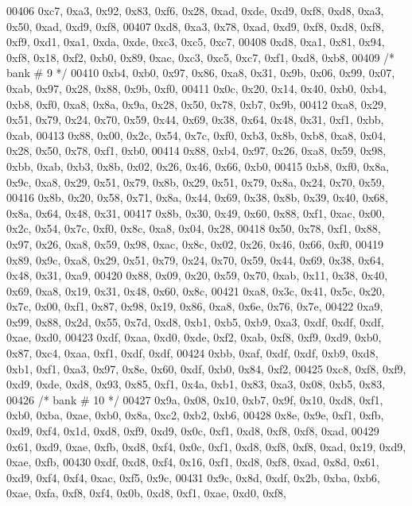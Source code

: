 \begin{DoxyCode}
00406     0xc7, 0xa3, 0x92, 0x83, 0xf6, 0x28, 0xad, 0xde, 0xd9, 0xf8, 0xd8, 0xa3, 0x50, 0xad, 0xd9, 0xf8,
00407     0xd8, 0xa3, 0x78, 0xad, 0xd9, 0xf8, 0xd8, 0xf8, 0xf9, 0xd1, 0xa1, 0xda, 0xde, 0xc3, 0xc5, 0xc7,
00408     0xd8, 0xa1, 0x81, 0x94, 0xf8, 0x18, 0xf2, 0xb0, 0x89, 0xac, 0xc3, 0xc5, 0xc7, 0xf1, 0xd8, 0xb8,
00409     \textcolor{comment}{/* bank # 9 */}
00410     0xb4, 0xb0, 0x97, 0x86, 0xa8, 0x31, 0x9b, 0x06, 0x99, 0x07, 0xab, 0x97, 0x28, 0x88, 0x9b, 0xf0,
00411     0x0c, 0x20, 0x14, 0x40, 0xb0, 0xb4, 0xb8, 0xf0, 0xa8, 0x8a, 0x9a, 0x28, 0x50, 0x78, 0xb7, 0x9b,
00412     0xa8, 0x29, 0x51, 0x79, 0x24, 0x70, 0x59, 0x44, 0x69, 0x38, 0x64, 0x48, 0x31, 0xf1, 0xbb, 0xab,
00413     0x88, 0x00, 0x2c, 0x54, 0x7c, 0xf0, 0xb3, 0x8b, 0xb8, 0xa8, 0x04, 0x28, 0x50, 0x78, 0xf1, 0xb0,
00414     0x88, 0xb4, 0x97, 0x26, 0xa8, 0x59, 0x98, 0xbb, 0xab, 0xb3, 0x8b, 0x02, 0x26, 0x46, 0x66, 0xb0,
00415     0xb8, 0xf0, 0x8a, 0x9c, 0xa8, 0x29, 0x51, 0x79, 0x8b, 0x29, 0x51, 0x79, 0x8a, 0x24, 0x70, 0x59,
00416     0x8b, 0x20, 0x58, 0x71, 0x8a, 0x44, 0x69, 0x38, 0x8b, 0x39, 0x40, 0x68, 0x8a, 0x64, 0x48, 0x31,
00417     0x8b, 0x30, 0x49, 0x60, 0x88, 0xf1, 0xac, 0x00, 0x2c, 0x54, 0x7c, 0xf0, 0x8c, 0xa8, 0x04, 0x28,
00418     0x50, 0x78, 0xf1, 0x88, 0x97, 0x26, 0xa8, 0x59, 0x98, 0xac, 0x8c, 0x02, 0x26, 0x46, 0x66, 0xf0,
00419     0x89, 0x9c, 0xa8, 0x29, 0x51, 0x79, 0x24, 0x70, 0x59, 0x44, 0x69, 0x38, 0x64, 0x48, 0x31, 0xa9,
00420     0x88, 0x09, 0x20, 0x59, 0x70, 0xab, 0x11, 0x38, 0x40, 0x69, 0xa8, 0x19, 0x31, 0x48, 0x60, 0x8c,
00421     0xa8, 0x3c, 0x41, 0x5c, 0x20, 0x7c, 0x00, 0xf1, 0x87, 0x98, 0x19, 0x86, 0xa8, 0x6e, 0x76, 0x7e,
00422     0xa9, 0x99, 0x88, 0x2d, 0x55, 0x7d, 0xd8, 0xb1, 0xb5, 0xb9, 0xa3, 0xdf, 0xdf, 0xdf, 0xae, 0xd0,
00423     0xdf, 0xaa, 0xd0, 0xde, 0xf2, 0xab, 0xf8, 0xf9, 0xd9, 0xb0, 0x87, 0xc4, 0xaa, 0xf1, 0xdf, 0xdf,
00424     0xbb, 0xaf, 0xdf, 0xdf, 0xb9, 0xd8, 0xb1, 0xf1, 0xa3, 0x97, 0x8e, 0x60, 0xdf, 0xb0, 0x84, 0xf2,
00425     0xc8, 0xf8, 0xf9, 0xd9, 0xde, 0xd8, 0x93, 0x85, 0xf1, 0x4a, 0xb1, 0x83, 0xa3, 0x08, 0xb5, 0x83,
00426     \textcolor{comment}{/* bank # 10 */}
00427     0x9a, 0x08, 0x10, 0xb7, 0x9f, 0x10, 0xd8, 0xf1, 0xb0, 0xba, 0xae, 0xb0, 0x8a, 0xc2, 0xb2, 0xb6,
00428     0x8e, 0x9e, 0xf1, 0xfb, 0xd9, 0xf4, 0x1d, 0xd8, 0xf9, 0xd9, 0x0c, 0xf1, 0xd8, 0xf8, 0xf8, 0xad,
00429     0x61, 0xd9, 0xae, 0xfb, 0xd8, 0xf4, 0x0c, 0xf1, 0xd8, 0xf8, 0xf8, 0xad, 0x19, 0xd9, 0xae, 0xfb,
00430     0xdf, 0xd8, 0xf4, 0x16, 0xf1, 0xd8, 0xf8, 0xad, 0x8d, 0x61, 0xd9, 0xf4, 0xf4, 0xac, 0xf5, 0x9c,
00431     0x9c, 0x8d, 0xdf, 0x2b, 0xba, 0xb6, 0xae, 0xfa, 0xf8, 0xf4, 0x0b, 0xd8, 0xf1, 0xae, 0xd0, 0xf8,

\end{DoxyCode}
